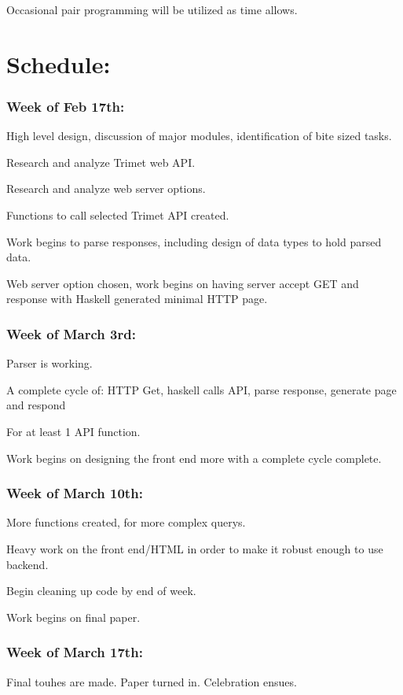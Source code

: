 \documentclass{article}
\begin{document}
Occasional pair programming will be utilized as time allows.

\section*{Schedule: }
\subsubsection*{Week of Feb 17th:}
High level design, discussion of major modules, identification of bite sized tasks.

Research and analyze Trimet web API.

Research and analyze web server options.

Functions to call selected Trimet API created.

Work begins to parse responses, including design of data types to hold parsed data.

Web server option chosen, work begins on having server accept GET and response
with Haskell generated minimal HTTP page.

\subsubsection*{Week of March 3rd:}
Parser is working.

A complete cycle of: HTTP Get, haskell calls API, parse response, generate page and respond

For at least 1 API function.  

Work begins on designing the front end more with a complete cycle complete.

\subsubsection*{Week of March 10th:}
More functions created, for more complex querys.

Heavy work on the front end/HTML in order to make it robust enough to use backend.

Begin cleaning up code by end of week.

Work begins on final paper.
\subsubsection*{Week of March 17th:}
Final touhes are made.  Paper turned in.  Celebration ensues.
\end{document}
